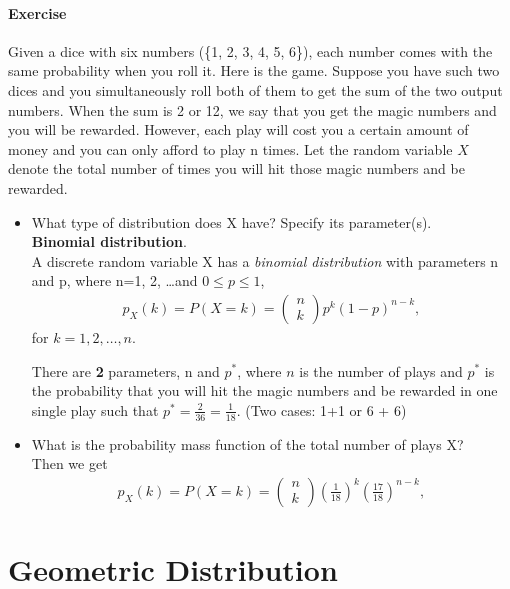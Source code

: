 \documentclass{article} %
\begin{document}
\paragraph*{Exercise} Given a dice with six numbers (\{1, 2, 3, 4, 5, 6\}), each number comes with the same probability when you roll it. Here is the game. Suppose you have such two dices and you simultaneously roll both of them to get the sum of the two output numbers. When the sum is 2 or 12, we say that you get the magic numbers and you will be rewarded. However, each play will cost you a certain amount of money and you can only afford to play n times. Let the random variable $X$ denote the total number of times you will hit those magic numbers and be rewarded. 
\begin{itemize}
\item What type of distribution does X have? Specify its parameter(s).  \\
{\bf Binomial distribution}.\\
A discrete random variable X has a {\em binomial distribution} with parameters n and p, where n=1, 2, \ldots and $0 \leq p \leq 1$, 
\begin{align*}
p_X(k)=P(X=k)=\left( \begin{array}{c} n \\ k \end{array} \right) p^k(1-p)^{n-k}, 
\end{align*}
for $k=1, 2, \ldots, n$. 

There are {\bf 2} parameters, n and $p^*$, where $n$ is the number of plays and $p^*$ is the probability that you will hit the magic numbers and be rewarded in one single play such that $p^* = \frac{2}{36}=\frac{1}{18}$. (Two cases: 1+1 or 6 + 6)
\item What is the probability mass function of the total number of plays X? \\
Then we get 
\begin{align*}
p_X(k)=P(X=k)=\left( \begin{array}{c} n \\ k \end{array} \right) (\frac{1}{18})^k(\frac{17}{18})^{n-k}, 
\end{align*}
\end{itemize}

\newpage
\section*{Geometric Distribution}
\end{document}
